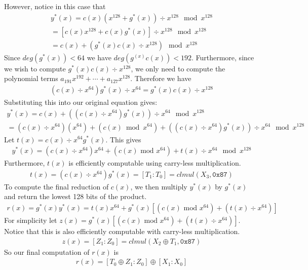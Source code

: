 \documentclass[hctr.tex]{subfiles}
\begin{document}
However, notice in this case that
\begin{gather*}
       y^*(x) = c(x)(x^{128} + g^*(x)) \div x^{128} \mod x^{128}\\
       = [c(x)x^{128} + c(x)g^*(x)] \div x^{128} \mod x^{128}\\
       = c(x) + (g^*(x)c(x) \div x^{128}) \mod x^{128}
\end{gather*}
Since $deg(g^*(x)) < 64$ we have $deg(g^(x)c(x)) < 192$. Furthermore, since we wish to compute $g^*(x)c(x) \div x^{128}$, we only need to compute the polynomial terms $a_{191}x^{192} + \cdots + a_{127}x^{128}$. Therefore we have
\begin{align*}
       (c(x) \div x^{64})g^*(x) \div x^{64} = g^*(x)c(x) \div x^{128}
\end{align*}
Substituting this into our original equation gives:
\begin{gather*}
       y^*(x) = c(x) + ((c(x) \div x^{64})g^*(x)) \div x^{64} \mod x^{128}\\
       = (c(x) \div x^{64})(x^{64}) + (c(x) \bmod x^{64}) + ((c(x) \div x^{64})g^*(x)) \div x^{64} \mod x^{128}
\end{gather*}
Let $t(x) = c(x) \div x^{64}g^*(x)$. This gives
\begin{align*}
       y^*(x) = (c(x) \div x^{64})x^{64} + (c(x) \text{ mod } x^{64}) + t(x) \div x^{64} \mod x^{128}
\end{align*}
Furthermore, $t(x)$ is efficiently computable using carry-less multiplication.
\begin{align*}
       t(x) = (c(x) \div x^{64})g^*(x) = [T_1 : T_0] = clmul(X_3, \texttt{0x87})
\end{align*}
To compute the final reduction of $c(x)$, we then multiply $y^*(x)$ by $g^*(x)$ and return the lowest 128 bits of the product.
\begin{align*}
       r(x) = g^*(x)y^*(x) = t(x)x^{64} + g^*(x)\left[(c(x) \text{ mod } x^{64}) + (t(x) \div x^{64})\right]
\end{align*}
For simplicity let $z(x) = g^*(x)\left[(c(x) \text{ mod } x^{64}) + (t(x) \div x^{64})\right]$. Notice that this is also efficiently computable with carry-less multiplication.
\begin{align*}
       z(x) = [Z_1 : Z_0] = clmul(X_2 \oplus T_1,\texttt{0x87})
\end{align*}
So our final computation of $r(x)$ is
\begin{align*}
       r(x) = [T_0 \oplus Z_1 : Z_0] \oplus [X_1 : X_0]
\end{align*}
\end{document}
